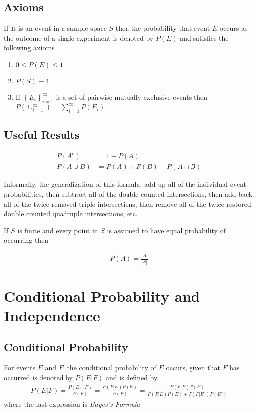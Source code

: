 \documentclass[10pt]{article}
\begin{document}
		\subsection*{Axioms}
		
		If $E$ is an event in a sample space $S$ then the probability that event $E$ occurs as the outcome of a single experiment is denoted by $P(E)$ and satisfies the following axioms
		
		\begin{enumerate}
			\item $0 \leq P(E) \leq 1$
			\item $P(S)=1$
			\item If $\left\{ E_i \right\}_{i=1}^\infty$ is a set of pairwise mutually exclusive events then $P(\cup_{i=1}^\infty)=\sum_{i=1}^\infty P(E_i)$
		\end{enumerate}
		
		\subsection*{Useful Results}
		
		\begin{align*}
			P(A^c) &= 1 - P(A)\\
			P(A \cup B) &= P(A) + P(B) - P(A \cap B)
		\end{align*}
		
		
		Informally, the generalization of this formula: add up all of the individual event probabilities, then subtract all of the double counted intersections, then add back all of the twice removed triple intersections, then remove all of the twice restored double counted quadruple intersections, etc.
		
		If $S$ is finite and every point in $S$ is assumed to have equal probability of occurring then
		
		\begin{align*}
			 P(A) = \frac{|A|}{|S|}
		\end{align*}
		
		\section{Conditional Probability and Independence}
		
		\subsection*{Conditional Probability}
		
		For events $E$ and $F$, the conditional probability of $E$ occurs, given that $F$ has occurred is denoted by  $P(E|F)$ and is defined by
		\begin{align*}
			P(E|F) 
				= \frac{P(E\cap F)}{P(F)}
				= \frac{P(F|E)P(E)}{P(F)}
				= \frac{P(F|E)P(E)}{P(F|E)P(E)+P(F|E^c)P(E^c)}
		\end{align*}
		where the last expression is \emph{Bayes's Formula}
		
\end{document}
